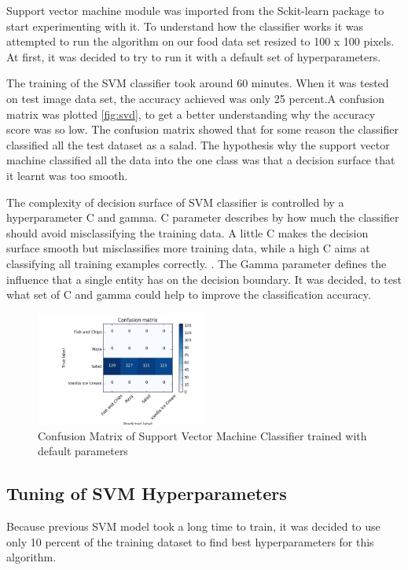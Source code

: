 Support vector machine module was imported from the Sckit-learn package to start experimenting with it. To understand how the classifier works it was attempted to run the algorithm on our food data set resized to 100 x 100 pixels. At first, it was decided to try to run it with a default set of hyperparameters.

The training of the SVM classifier took around 60 minutes. When it was tested on test image data set, the accuracy achieved was only 25 percent.A confusion matrix was plotted \autoref{fig:svd},  to get a better understanding why the accuracy score was so low. The confusion matrix showed that for some reason the classifier classified all the test dataset as a salad. The hypothesis why the support vector machine classified all the data into the one class was that a decision surface that it learnt was too smooth.

The complexity of decision surface of SVM classifier is controlled by a  hyperparameter C and gamma. C parameter describes by how much the classifier should avoid misclassifying the training data. A little C makes the decision surface smooth but misclassifies more training data, while a high C aims at classifying all training examples correctly. \citep{hyper}. The Gamma parameter defines the influence that a single entity has on the decision boundary.  It was decided, to test what set of C and gamma could help to improve the classification accuracy.



\begin{figure}[h]
\centering
\includegraphics[width=0.5\textwidth]{Figures/svm_default.jpg}
\caption{Confusion Matrix of Support Vector Machine Classifier trained with default parameters}
\label{fig:svd}
\end{figure}


\subsection{Tuning of SVM Hyperparameters}

Because previous SVM model took a long time to train, it was decided to use only 10 percent of the training dataset to find best hyperparameters for this algorithm.

